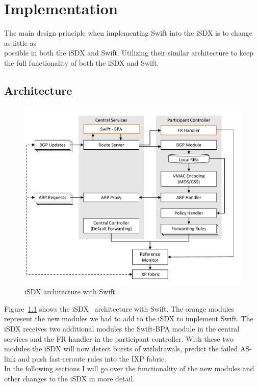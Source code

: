 \chapter{\label{chapter3}Implementation}


The main design principle when implementing Swift into the iSDX is to change as little as \\ 
possible in both the iSDX and Swift. Utilizing their similar architecture to keep the full functionality of both the iSDX and Swift.

\section{\label{chapter3:Architecture}Architecture}

\begin{figure}[h]
\center
\includegraphics[scale = 0.7]{Figures/design_sdx_swift_cropped.pdf}
\caption{iSDX architecture with Swift}
\label{fig:isdx_architecture_with_swift}
\end{figure}

Figure~\ref{fig:isdx_architecture_with_swift} shows the iSDX~\cite{feamster2013sdx} architecture with Swift. The orange modules represent the new modules we had to add to the iSDX to implement Swift. The iSDX receives two additional modules the Swift-BPA module in the central services and the FR handler in the participant controller. With these two modules the iSDX will now detect bursts of withdrawals, predict the failed AS-link and push fast-reroute rules into the IXP fabric. \\
In the following sections I will go over the functionality of the new modules and other changes to the iSDX in more detail.

